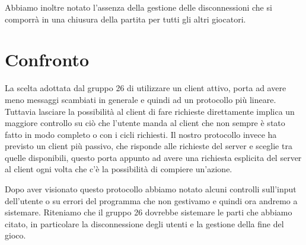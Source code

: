 \documentclass[12pt]{article}
\begin{document}
	Abbiamo inoltre notato l’assenza della gestione delle disconnessioni che si comporrà in una chiusura della partita per tutti gli altri giocatori.
	
	\section*{Confronto}
	
	La scelta adottata dal gruppo 26 di utilizzare un client attivo, porta ad avere meno messaggi scambiati in generale e quindi ad un protocollo più lineare. Tuttavia lasciare la possibilità al client di fare richieste direttamente implica un maggiore controllo su ciò che l’utente manda al client che non sempre è stato fatto in modo completo o con i cicli richiesti. Il nostro protocollo invece ha previsto un client più passivo, che risponde alle richieste del server e sceglie tra quelle disponibili, questo porta appunto ad avere una richiesta esplicita del server al client ogni volta che c’è la possibilità di compiere un’azione.
	
	Dopo aver visionato questo protocollo abbiamo notato alcuni controlli sull’input dell’utente o su errori del programma che non gestivamo e quindi ora andremo a sistemare. Riteniamo che il gruppo 26 dovrebbe sistemare le parti che abbiamo citato, in particolare la disconnessione degli utenti e la gestione della fine del gioco.
	
\end{document}

